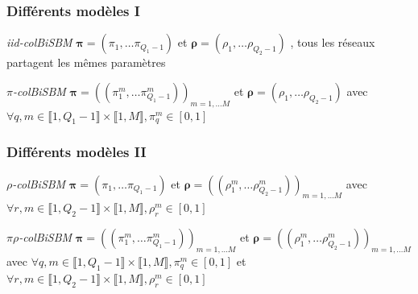 \documentclass{beamer}
\begin{document}
\begin{frame}
    \frametitle{Différents modèles I}
    \begin{block}{\emph{iid-colBiSBM}}
        $\bm{\pi} = (\pi_1, \dots \pi_{Q_1-1})$ et $\bm{\rho} = (\rho_1, \dots \rho_{Q_2-1})$ %
        , tous les réseaux partagent les mêmes paramètres\footnotemark[3]
    \end{block}
    \begin{block}{\emph{$\pi$-colBiSBM}}
        $\bm{\pi} = ((\pi_1^m, \dots \pi_{Q_1-1}^m))_{m=1,\dots M}$ et $\bm{\rho} = (\rho_1, \dots \rho_{Q_2-1})$ %
        avec $\forall q,m \in \llbracket 1, Q_1-1 \rrbracket \times \llbracket 1, M \rrbracket, \pi_q^m \in \left[ 0,1 \right] $
    \end{block}
\end{frame}
\begin{frame}
    \frametitle{Différents modèles II}
    \begin{block}{\emph{$\rho$-colBiSBM}}
        $\bm{\pi} = (\pi_1, \dots \pi_{Q_1-1})$ et $\bm{\rho} = ((\rho_1^m, \dots \rho_{Q_2-1}^m))_{m=1,\dots M}$ %
        avec $\forall r,m \in \llbracket 1, Q_2-1 \rrbracket \times \llbracket 1, M \rrbracket, \rho_r^m \in \left[ 0,1 \right] $
    \end{block}
    \begin{block}{\emph{$\pi\rho$-colBiSBM}}
        $\bm{\pi} = ((\pi_1^m, \dots \pi_{Q_1-1}^m))_{m=1,\dots M}$ et $\bm{\rho} = ((\rho_1^m, \dots \rho_{Q_2-1}^m))_{m=1,\dots M}$ %
        avec $\forall q,m \in \llbracket 1, Q_1-1 \rrbracket \times \llbracket 1, M \rrbracket, \pi_q^m \in \left[ 0,1 \right]$
        et $\forall r,m \in \llbracket 1, Q_2-1 \rrbracket \times \llbracket 1, M \rrbracket, \rho_r^m \in \left[ 0,1 \right]$
    \end{block}
\end{frame}
\end{document}
